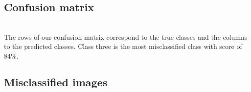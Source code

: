 \documentclass{article}
\begin{document}
\subsection{Confusion matrix}

    \begin{figure}[hbt!]
    \begin{floatrow}
	\end{floatrow}
	\end{figure}\\
	
The rows of our confusion matrix correspond to the true classes and the columns to the predicted classes. Class three is the most misclassified class with score of 84\%. 

\newpage

\subsection{Misclassified images}
\end{document}
